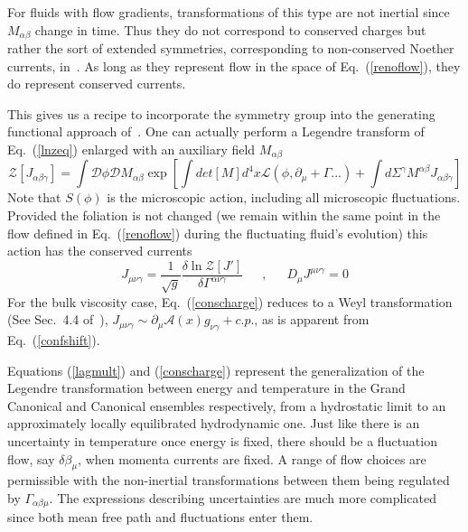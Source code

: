 \documentclass[12pt,onecolumn,showpacs,amssymb,aps,nofootinbib,floatfix]{revtex4-2}
\renewcommand{\eqref}[1]{Eq.~(\ref{#1})}
\newcommand{\eqcomma}{\phantom{AA},\phantom{AA}}
\newcommand{\lnz}{\ln \mathcal{Z}}
\begin{document}
	For fluids with flow gradients, transformations of this type are not inertial since $M_{\alpha \beta}$ change in time. Thus they do not correspond to conserved charges but rather the sort of extended symmetries, corresponding to non-conserved Noether currents, in~\cite{grossi}.  As long as they represent
	flow in the space of \eqref{renoflow}, they do represent conserved currents.  
	
	This gives us a recipe to incorporate the symmetry group into the generating functional approach of~\cite{grossi}. One can actually perform a Legendre transform of \eqref{lnzeq} enlarged with an auxiliary field $M_{\alpha \beta}$\\
	\begin{equation}
		\label{lagmult}
		\mathcal{Z}[J_{\alpha \beta \gamma}] = \int \mathcal{D}\phi \mathcal{D}M_{\alpha \beta} \exp\left[ \int det[M] d^4 x \mathcal{L}\left( \phi,\partial_\mu + \Gamma...\right)+ \int d\Sigma^\gamma M^{\alpha \beta} J_{\alpha \beta \gamma} \right]
	\end{equation}
	Note that $S(\phi)$ is the microscopic action, including all microscopic fluctuations.  
	Provided the foliation is not changed (we remain within the same point in the flow defined in \eqref{renoflow} during the fluctuating fluid's evolution)
	this action has the conserved currents
	\begin{equation}
		\label{conscharge}
		J_{\mu \nu \gamma} =\frac{1}{\sqrt{g}}\frac{\delta \lnz [J']}{\delta \Gamma^{\alpha \nu \gamma}} \eqcomma
		D_\mu J^{\mu \nu \gamma}=0
	\end{equation}
	For the bulk viscosity case, \eqref{conscharge} reduces to a Weyl transformation (See Sec.~4.4 of~\cite{grossi}), $J_{\mu \nu \gamma} \sim \partial_{\mu}\mathcal{A}(x) g_{\nu \gamma}+c.p.$, as is apparent from \eqref{confshift}.
	
	Equations (\ref{lagmult}) and (\ref{conscharge}) represent the generalization of the Legendre transformation between energy and temperature in the Grand Canonical and Canonical ensembles respectively, from a hydrostatic limit to an approximately locally equilibrated hydrodynamic one.
	Just like there is an uncertainty in temperature once energy is fixed, there should be a fluctuation flow, say $\delta\beta_\mu$, when momenta currents are fixed. A range of flow choices are permissible with the non-inertial transformations between them being regulated by $\Gamma_{\alpha \beta \mu}$.
	The expressions describing uncertainties are much more complicated since both mean free path and fluctuations enter them.
	
\end{document}
